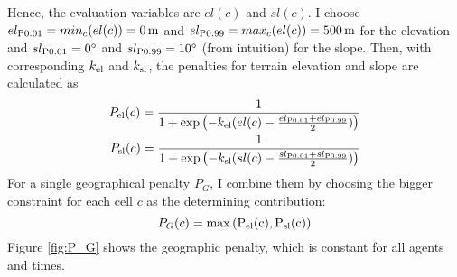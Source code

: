 Hence, the evaluation variables are $el(c)$ and $sl(c)$. 
I choose $el_{\rm P0.01}=min_c(el(c))=0\, {\rm m}$ and $el_{\rm P0.99}=max_c(el(c)) = 500\, {\rm m}$ for the elevation and $sl_{\rm P0.01}=0^\circ$ and $sl_{\rm P0.99}=10^\circ$ (from intuition) for the slope. 
Then, with corresponding $k_{\rm el}$ and $k_{\rm sl}$, the penalties for terrain elevation and slope are calculated as 
\begin{eqnarray}
	P_{\text{el}}(c) = \frac{1}{1+\exp\left( - k_{\rm el} (el(c)-\frac{el_{\rm P0.01}+el_{\rm P0.99}}{2}) \right)}\\
	P_{\text{sl}}(c) = \frac{1}{1+\exp\left( - k_{\rm sl} (sl(c)-\frac{sl_{\rm P0.01}+sl_{\rm P0.99}}{2}) \right)}
\end{eqnarray}
For a single geographical penalty $P_G$, I combine them by choosing the bigger constraint for each cell $c$ as the determining contribution:
\begin{equation}
P_G (c) = \rm{max}\left(P_\text{el}(c), P_\text{sl}(c) \right)
\end{equation}
Figure \ref{fig:P_G} shows the geographic penalty, which is constant for all agents and times.
		
